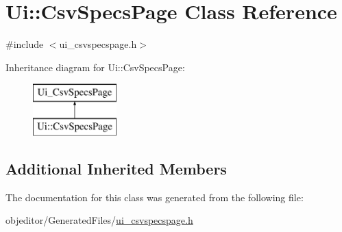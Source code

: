 \hypertarget{class_ui_1_1_csv_specs_page}{}\section{Ui\+::Csv\+Specs\+Page Class Reference}
\label{class_ui_1_1_csv_specs_page}


{\ttfamily \#include $<$ui\+\_\+csvspecspage.\+h$>$}

Inheritance diagram for Ui\+::Csv\+Specs\+Page\+:\begin{figure}[H]
\begin{center}
\leavevmode
\includegraphics[height=2.000000cm]{d0/db0/class_ui_1_1_csv_specs_page}
\end{center}
\end{figure}
\subsection*{Additional Inherited Members}


The documentation for this class was generated from the following file\+:\begin{DoxyCompactItemize}
\item 
objeditor/\+Generated\+Files/\mbox{\hyperlink{ui__csvspecspage_8h}{ui\+\_\+csvspecspage.\+h}}\end{DoxyCompactItemize}
